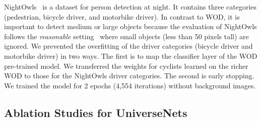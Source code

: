 \documentclass[10pt,twocolumn,letterpaper]{article}
\newcommand{\Univs}{UniverseNets\xspace}
\begin{document}
NightOwls~\cite{NightowlsDataset_ACCV2018} is a dataset for person detection at night.
It contains three categories (pedestrian, bicycle driver, and motorbike driver).
In contrast to WOD, it is important to detect medium or large objects
because the evaluation of NightOwls follows the \textit{reasonable} setting~\cite{Caltech_PAMI2012}
where small objects (less than 50 pixels tall) are ignored.
We prevented the overfitting of the driver categories (bicycle driver and motorbike driver) in two ways.
The first is to map the classifier layer of the WOD pre-trained model.
We transferred the weights for cyclists learned on the richer WOD to those for the NightOwls driver categories.
The second is early stopping.
We trained the model for 2 epochs (4,554 iterations) without background images.









\subsection{Ablation Studies for \Univs}
\label{sec:coco_ablation}
\end{document}
